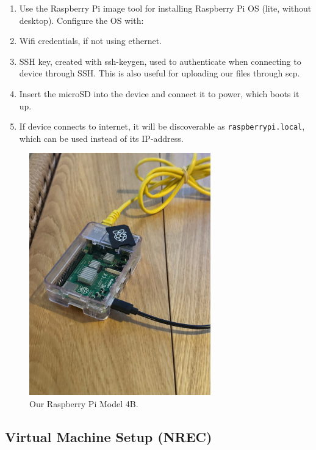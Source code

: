 \documentclass[
  table]{report}
\providecommand{\tightlist}{%
  \setlength{\itemsep}{0pt}\setlength{\parskip}{0pt}}
\begin{document}
\begin{enumerate}
\def\labelenumi{\arabic{enumi}.}
\tightlist
\item
  Use the Raspberry Pi image tool for installing Raspberry Pi OS (lite,
  without desktop). Configure the OS with:
\item
  Wifi credentials, if not using ethernet.
\item
  SSH key, created with ssh-keygen, used to authenticate when connecting
  to device through SSH. This is also useful for uploading our files
  through scp.
\item
  Insert the microSD into the device and connect it to power, which
  boots it up.
\item
  If device connects to internet, it will be discoverable as
  \texttt{raspberrypi.local}, which can be used instead of its
  IP-address.
\end{enumerate}

\begin{figure}[H]
\centering
  \includegraphics[width=0.7\textwidth]{assets/raspberry-setup.jpeg}
  \caption{Our Raspberry Pi Model 4B.}
  \label{fig:rpi_setup}
\end{figure}

\subsection{Virtual Machine Setup (\ac{NREC})}
\end{document}
